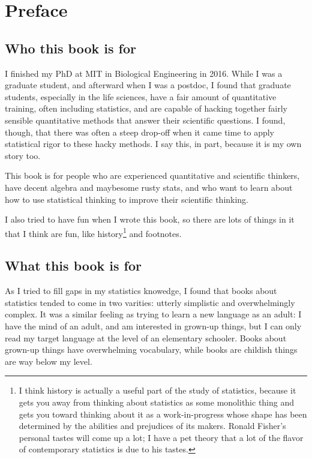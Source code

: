 
\chapter{Preface}

\section*{Who this book is for}

I finished my PhD at MIT in Biological Engineering in 2016. While I was a
graduate student, and afterward when I was a postdoc, I found that graduate
students, especially in the life sciences, have a fair amount of quantitative
training, often including statistics, and are capable of hacking together
fairly sensible quantitative methods that answer their scientific questions. I
found, though, that there was often a steep drop-off when it came time to apply
statistical rigor to these hacky methods. I say this, in part, because it is my
own story too.

This book is for people who are experienced quantitative and scientific
thinkers, have decent algebra and maybesome rusty stats, and who want to learn
about how to use statistical thinking to improve their scientific thinking.

I also tried to have fun when I wrote this book, so there are lots of things
in it that I think are fun, like history\footnote{I think history is actually
a useful part of the study of statistics, because it gets you away from
thinking about statistics as some monolithic thing and gets you toward
thinking about it as a work-in-progress whose shape has been determined by the
abilities and prejudices of its makers. Ronald Fisher's personal tastes will
come up a lot; I have a pet theory that a lot of the flavor of contemporary
statistics is due to his tastes.} and footnotes.

\section*{What this book is for}

As I tried to fill gaps in my statistics knowedge, I found that books about
statistics tended to come in two varities: utterly simplistic and
overwhelmingly complex. It was a similar feeling as trying to learn a new
language as an adult: I have the mind of an adult, and am interested in
grown-up things, but I can only read my target language at the level of an
elementary schooler. Books about grown-up things have overwhelming vocabulary,
while books are childish things are way below my level.

